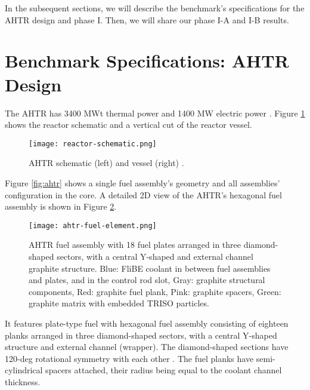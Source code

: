In the subsequent sections, we will describe the benchmark's specifications for 
the \gls{AHTR} design and phase I. Then, we will share our phase I-A and I-B 
results. 

\section{Benchmark Specifications: AHTR Design}
The \gls{AHTR} has 3400 MWt thermal power and 1400 MW electric power 
\cite{varma_ahtr_2012}. 
Figure \ref{fig:reactor-schematic} shows the reactor schematic and a vertical 
cut of the reactor vessel. 
\begin{figure}[]
    \centering
    \texttt{[image: reactor-schematic.png]} 
    \caption{\acrlong{AHTR} schematic (left) and vessel (right) 
    \cite{noauthor_fluoride_nodate}.}
    \label{fig:reactor-schematic}
\end{figure}
Figure \ref{fig:ahtr} shows a single fuel assembly's geometry and all 
assemblies' configuration in the core.
A detailed 2D view of the \gls{AHTR}'s hexagonal fuel assembly is shown in 
Figure \ref{fig:ahtr-fuel-assembly}.  
\begin{figure}[]
    \centering
    \texttt{[image: ahtr-fuel-element.png]} 
    \caption{\acrlong{AHTR} fuel assembly with 18 fuel plates arranged in 
    three diamond-shaped sectors, with a central Y-shaped and external channel 
    graphite structure. Blue: FliBE coolant in between fuel assemblies and plates, 
    and in the control rod slot, Gray: graphite structural components, 
    Red: graphite fuel plank, Pink: graphite spacers, Green: graphite matrix 
    with embedded TRISO particles.}
    \label{fig:ahtr-fuel-assembly}
\end{figure}
It features plate-type fuel with hexagonal fuel assembly consisting of eighteen 
planks arranged in three diamond-shaped sectors, with a central Y-shaped 
structure and external channel (wrapper).
The diamond-shaped sections have 120-deg rotational symmetry with each other 
\cite{varma_ahtr_2012,ramey_monte_2018,noauthor_fluoride_nodate}. 
The fuel planks have semi-cylindrical spacers attached, their radius being 
equal to the coolant channel thickness. 

